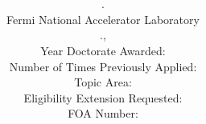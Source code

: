 

\title{\color{NALblue} \bf{\Title}}
\author{\Name. \JobTitle
\\ Fermi National Accelerator Laboratory
\\ \PhoneFirst.\PhoneLast, \EmailFirst\EmailLast
\\Year Doctorate Awarded: \YearPhD
\\Number of Times Previously Applied: \NumPrev
\\ Topic Area: \TopicArea
\\Eligibility Extension Requested: \ExtensionReq
\\FOA Number:  \FOANumber}
